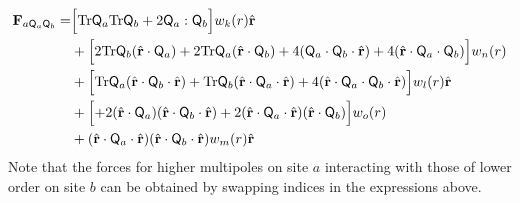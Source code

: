 \begin{align}
%
%
%
\begin{split}
\mathbf{F}_{a \mathsf{Q}_a \mathsf{Q}_b} =& 
 \Bigl[
\text{Tr}\mathsf{Q}_a \text{Tr}\mathsf{Q}_b 
+ 2  \mathsf{Q}_a :  \mathsf{Q}_b \Bigr] w_k(r) \hat{\mathbf{r}} \\
&+ \Bigl[
2\text{Tr}\mathsf{Q}_b  (\hat{\mathbf{r}} \cdot \mathsf{Q}_a )  
+ 2\text{Tr}\mathsf{Q}_a  (\hat{\mathbf{r}} \cdot \mathsf{Q}_b ) 
+4 (\mathsf{Q}_a  \cdot  \mathsf{Q}_b \cdot \hat{\mathbf{r}})  
+  4(\hat{\mathbf{r}} \cdot \mathsf{Q}_a \cdot \mathsf{Q}_b) \Bigr] w_n(r) \\
&+  \Bigl[
\text{Tr}\mathsf{Q}_a (\hat{\mathbf{r}} \cdot \mathsf{Q}_b \cdot \hat{\mathbf{r}}) 
+ \text{Tr}\mathsf{Q}_b
(\hat{\mathbf{r}} \cdot \mathsf{Q}_a  \cdot \hat{\mathbf{r}})  
+4 (\hat{\mathbf{r}} \cdot \mathsf{Q}_a \cdot  
\mathsf{Q}_b   \cdot \hat{\mathbf{r}}) \Bigr] w_l(r) \hat{\mathbf{r}} \\
%
&+ \Bigl[
+ 2 (\hat{\mathbf{r}} \cdot \mathsf{Q}_a )
(\hat{\mathbf{r}} \cdot \mathsf{Q}_b \cdot \hat{\mathbf{r}})
+2 (\hat{\mathbf{r}} \cdot \mathsf{Q}_a \cdot \hat{\mathbf{r}})
(\hat{\mathbf{r}} \cdot \mathsf{Q}_b ) \Bigr] w_o(r) \\
&+ 
(\hat{\mathbf{r}} \cdot \mathsf{Q}_a  \cdot \hat{\mathbf{r}}) 
(\hat{\mathbf{r}} \cdot \mathsf{Q}_b \cdot \hat{\mathbf{r}}) w_m(r) \hat{\mathbf{r}} \end{split}
\end{align}
Note that the forces for higher multipoles on site $a$
interacting with those of lower order on site $b$ can be
obtained by swapping indices in the expressions above.

